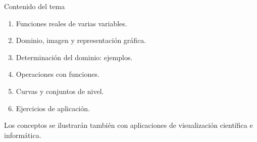 \documentclass[main.tex]{subfiles}
\begin{document}
\graphicspath{{imagenes/tema1/}{../imagenes/tema1/}}

\begin{frame}{Contenido del tema}
\begin{enumerate}
\item Funciones reales de varias variables.
\item Dominio, imagen y representación gráfica.
\item Determinación del dominio: ejemplos.
\item Operaciones con funciones.
\item Curvas y conjuntos de nivel.
\item Ejercicios de aplicación.
\end{enumerate}
\medskip
\small Los conceptos se ilustrarán también con aplicaciones de visualización científica e informática.
\end{frame}
\end{document}
